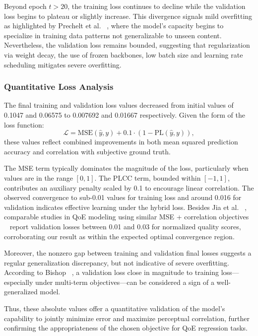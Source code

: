 Beyond epoch $t > 20$, the training loss continues to decline while the validation loss begins to plateau or slightly increase. This divergence signals mild overfitting as highlighted by Prechelt et al. ~\cite{prechelt1998early}, where the model's capacity begins to specialize in training data patterns not generalizable to unseen content. Nevertheless, the validation loss remains bounded, suggesting that regularization via weight decay, the use of frozen backbones, low batch size and learning rate scheduling mitigates severe overfitting.

\subsubsection{Quantitative Loss Analysis}
The final training and validation loss values decreased from initial values of 0.1047 and 0.06575 to 0.007692 and 0.01667 respectively. Given the form of the loss function:
\begin{equation}
\mathcal{L} = \text{MSE}(\hat{y}, y) + 0.1 \cdot (1 - \text{PL}(\hat{y}, y)),
\end{equation}
these values reflect combined improvements in both mean squared prediction accuracy and correlation with subjective ground truth.

The MSE term typically dominates the magnitude of the loss, particularly when values are in the range $[0,1]$. The PLCC term, bounded within $[-1, 1]$, contributes an auxiliary penalty scaled by 0.1 to encourage linear correlation. The observed convergence to sub-0.01 values for training loss and around 0.016 for validation indicates effective learning under the hybrid loss. Besides Jia et al. ~\cite{jia2024continuous}, comparable studies in QoE modeling using similar MSE + correlation objectives ~\cite{li2019qoe} report validation losses between 0.01 and 0.03 for normalized quality scores, corroborating our result as within the expected optimal convergence region.

Moreover, the nonzero gap between training and validation final losses suggests a regular generalization discrepancy, but not indicative of severe overfitting. According to Bishop ~\cite{bishop2006pattern}, a validation loss close in magnitude to training loss—especially under multi-term objectives—can be considered a sign of a well-generalized model.

Thus, these absolute values offer a quantitative validation of the model's capability to jointly minimize error and maximize perceptual correlation, further confirming the appropriateness of the chosen objective for QoE regression tasks.

